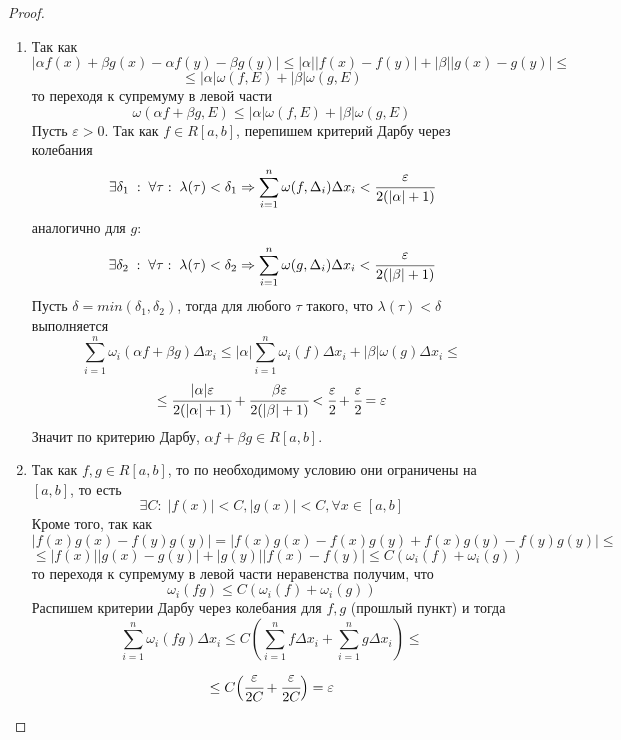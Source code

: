 \documentclass{article}
\newcommand*{\eps}{\varepsilon}
\begin{document}
\begin{proof}
    \begin{enumerate}
        \item Так как
        $$
            |\alpha f(x) + \beta g(x) - \alpha f(y) - \beta g(y)| \leq |\alpha||f(x) - f(y)| + |\beta||g(x) - g(y)| \leq 
        $$  
        $$
            \leq |\alpha|\omega(f, E) + |\beta|\omega(g, E)
        $$
        то переходя к супремуму в левой части
        $$
            \omega(\alpha f + \beta g, E) \leq |\alpha|\omega(f, E) + |\beta|\omega(g, E)
        $$
        Пусть $\varepsilon > 0$. Так как $f \in R[a, b]$, перепишем критерий Дарбу через колебания
        $$
            \exists \delta_1 \; : \; \forall \tau: \; \lambda(\tau) < \delta_1 \Rightarrow \sum_{i = 1}^{n} \omega(f, \Delta_i)\Delta x_i < \cfrac{\varepsilon}{2(|\alpha| + 1)}        
        $$
        аналогично для $g$:
        $$
            \exists \delta_2 \; : \; \forall \tau: \; \lambda(\tau) < \delta_2 \Rightarrow \sum_{i = 1}^{n} \omega(g, \Delta_i)\Delta x_i < \cfrac{\varepsilon}{2(|\beta| + 1)}        
        $$  
        Пусть $\delta = min(\delta_1, \delta_2)$, тогда для любого $\tau$ такого, что $\lambda(\tau) < \delta$ выполняется
        $$
            \sum_{i = 1}^{n} \omega_i (\alpha f + \beta g)\Delta x_i \leq |\alpha| \sum_{i = 1}^{n} \omega_i(f)\Delta x_i + |\beta|\omega(g)\Delta x_i \leq 
        $$
        $$
            \leq \cfrac{|\alpha|\varepsilon}{2(|\alpha| + 1)} + \cfrac{\beta \varepsilon}{2(|\beta| + 1)} < \cfrac{\varepsilon}{2} + \cfrac{\varepsilon}{2} = \varepsilon
        $$
        Значит по критерию Дарбу, $\alpha f + \beta g \in R[a, b]$.
        \item Так как $f, g \in R[a, b]$, то по необходимому условию они ограничены на $[a, b]$, то есть
        $$
            \exists C:\; |f(x)| < C, |g(x)| < C, \forall x \in [a, b]
        $$
        Кроме того, так как 
        $$
            |f(x)g(x) - f(y)g(y)| = |f(x)g(x) - f(x)g(y) + f(x)g(y) - f(y)g(y)| \leq
        $$
        $$
            \leq |f(x)||g(x) - g(y)| + |g(y)||f(x) - f(y)| \leq C(\omega_i(f) + \omega_i(g))
        $$
        то переходя к супремуму в левой части неравенства получим, что 
        $$
            \omega_i(fg) \leq C(\omega_i(f) + \omega_i(g))
        $$
        Распишем критерии Дарбу через колебания для $f, g$ (прошлый пункт) и тогда 
        $$
            \sum_{i = 1}^{n} \omega_i(fg) \Delta x_i \leq C(\sum_{i = 1}^{n}f \Delta x_i + \sum_{i = 1}^{n}g \Delta x_i) \leq
        $$
        $$
            \leq C\Bigl(\cfrac{\eps}{2C} + \cfrac{\eps}{2C}\Bigr) = \eps
$$
\end{enumerate}
\end{proof}
\end{document}
